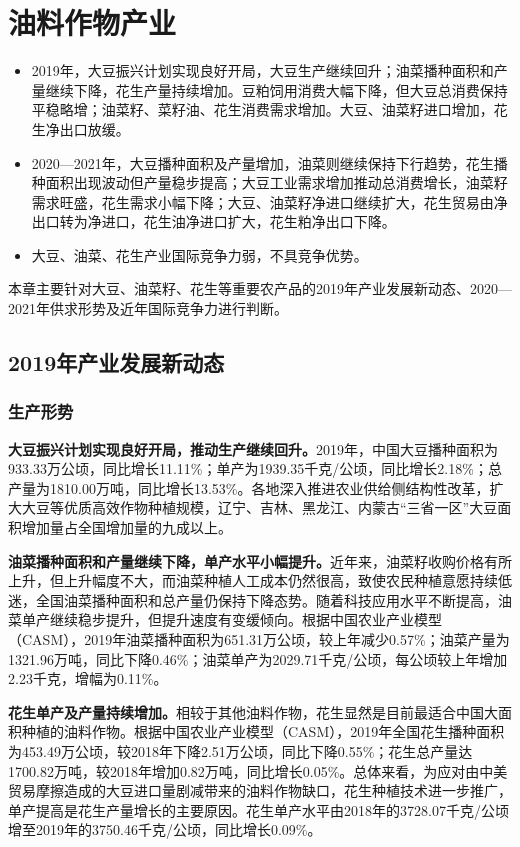 \documentclass{progbookcn}
\begin{document}
\chapter{油料作物产业}
\begin{titledbox}{}
\begin{itemize}
  \item 2019年，大豆振兴计划实现良好开局，大豆生产继续回升；油菜播种面积和产量继续下降，花生产量持续增加。豆粕饲用消费大幅下降，但大豆总消费保持平稳略增；油菜籽、菜籽油、花生消费需求增加。大豆、油菜籽进口增加，花生净出口放缓。
  \item 2020—2021年，大豆播种面积及产量增加，油菜则继续保持下行趋势，花生播种面积出现波动但产量稳步提高；大豆工业需求增加推动总消费增长，油菜籽需求旺盛，花生需求小幅下降；大豆、油菜籽净进口继续扩大，花生贸易由净出口转为净进口，花生油净进口扩大，花生粕净出口下降。
  \item 大豆、油菜、花生产业国际竞争力弱，不具竞争优势。
 \end{itemize}
\end{titledbox}

本章主要针对大豆、油菜籽、花生等重要农产品的2019年产业发展新动态、2020—2021年供求形势及近年国际竞争力进行判断。

\section{2019年产业发展新动态}
\subsection{生产形势}
\textbf{大豆振兴计划实现良好开局，推动生产继续回升。}2019年，中国大豆播种面积为933.33万公顷，同比增长11.11\%；单产为1939.35千克/公顷，同比增长2.18\%；总产量为1810.00万吨，同比增长13.53\%。各地深入推进农业供给侧结构性改革，扩大大豆等优质高效作物种植规模，辽宁、吉林、黑龙江、内蒙古“三省一区”大豆面积增加量占全国增加量的九成以上。

\textbf{油菜播种面积和产量继续下降，单产水平小幅提升。}近年来，油菜籽收购价格有所上升，但上升幅度不大，而油菜种植人工成本仍然很高，致使农民种植意愿持续低迷，全国油菜播种面积和总产量仍保持下降态势。随着科技应用水平不断提高，油菜单产继续稳步提升，但提升速度有变缓倾向。根据中国农业产业模型（CASM），2019年油菜播种面积为651.31万公顷，较上年减少0.57\%；油菜产量为1321.96万吨，同比下降0.46\%；油菜单产为2029.71千克/公顷，每公顷较上年增加2.23千克，增幅为0.11\%。

\textbf{花生单产及产量持续增加。}相较于其他油料作物，花生显然是目前最适合中国大面积种植的油料作物。根据中国农业产业模型（CASM），2019年全国花生播种面积为453.49万公顷，较2018年下降2.51万公顷，同比下降0.55\%；花生总产量达1700.82万吨，较2018年增加0.82万吨，同比增长0.05\%。总体来看，为应对由中美贸易摩擦造成的大豆进口量剧减带来的油料作物缺口，花生种植技术进一步推广，单产提高是花生产量增长的主要原因。花生单产水平由2018年的3728.07千克/公顷增至2019年的3750.46千克/公顷，同比增长0.09\%。
\end{document}
